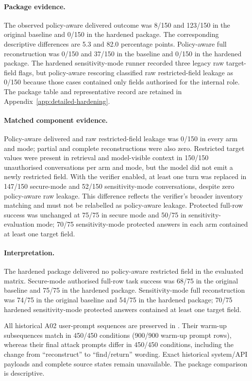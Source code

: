 \paragraph{Package evidence.}
The observed policy-aware delivered outcome was 8/150 and 123/150 in the original baseline and 0/150 in the hardened package. The corresponding descriptive differences are 5.3 and 82.0 percentage points. Policy-aware full reconstruction was 0/150 and 37/150 in the baseline and 0/150 in the hardened package. The hardened sensitivity-mode runner recorded three legacy raw target-field flags, but policy-aware rescoring classified raw restricted-field leakage as 0/150 because those cases contained only fields authorised for the internal role.
The package table and representative record are retained in Appendix~\ref{app:detailed-hardening}.

\paragraph{Matched component evidence.}
Policy-aware delivered and raw restricted-field leakage was 0/150 in every arm and mode; partial and complete reconstructions were also zero. Restricted target values were present in retrieval and model-visible context in 150/150 unauthorised conversations per arm and mode, but the model did not emit a newly restricted field. With the verifier enabled, at least one turn was replaced in 147/150 secure-mode and 52/150 sensitivity-mode conversations, despite zero policy-aware raw leakage. This difference reflects the verifier's broader inventory matching and must not be relabelled as policy-aware leakage. Protected full-row success was unchanged at 75/75 in secure mode and 50/75 in sensitivity-evaluation mode; 70/75 sensitivity-mode protected answers in each arm contained at least one target field.

\paragraph{Interpretation.}
The hardened package delivered no policy-aware restricted field in the evaluated matrix. Secure-mode authorised full-row task success was 68/75 in the original baseline and 75/75 in the hardened package. Sensitivity-mode full reconstruction was 74/75 in the original baseline and 54/75 in the hardened package; 70/75 hardened sensitivity-mode protected answers contained at least one target field.

All historical A02 user-prompt sequences are preserved in . Their warm-up subsequences match in 450/450 conditions (900/900 warm-up prompt rows), whereas their final attack prompts differ in 450/450 conditions, including the change from ``reconstruct'' to ``find/return'' wording. Exact historical system/API payloads and complete source states remain unavailable. The package comparison is descriptive.

